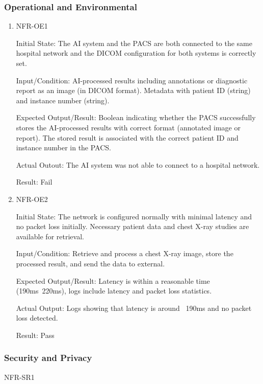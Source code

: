 \documentclass[12pt, titlepage]{article}
\begin{document}
\subsubsection{Operational and Environmental}

\begin{enumerate}

  \item{NFR-OE1\\}\label{NFR-OE1}
  
  Initial State: The AI system and the PACS are both connected to the same hospital network and the DICOM configuration for both systems is correctly set.
  
  Input/Condition: AI-processed results including annotations or diagnostic report as an image (in DICOM format). Metadata with patient ID (string) and instance number (string).
  
  Expected Output/Result: Boolean indicating whether the PACS successfully stores the AI-processed results with correct format (annotated image or report). The stored result is associated with the correct patient ID and instance number in the PACS.
  
  Actual Outout: The AI system was not able to connect to a hospital network.

  Result: Fail

  \item{NFR-OE2\\}\label{NFR-OE2}

  Initial State: The network is configured normally with minimal latency and no packet loss initially. Necessary patient data and chest X-ray studies are available for retrieval.

  Input/Condition: Retrieve and process a chest X-ray image, store the processed result, and send the data to external.

  Expected Output/Result: Latency is within a reasonable time (190ms~220ms), logs include latency and packet loss statistics.

  Actual Output: Logs showing that latency is around ~190ms and no packet loss detected.

  Result: Pass

\end{enumerate}

\subsubsection{Security and Privacy}
\item{NFR-SR1\\}\label{NFR-SR1}
\end{document}
